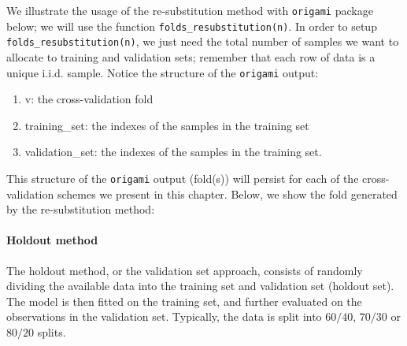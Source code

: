 \documentclass[12pt, krantz2,]{krantz}
\newenvironment{Shaded}{\begin{snugshade}}{\end{snugshade}}
\newcommand{\CommentTok}[1]{\textcolor[rgb]{0.37,0.37,0.37}{\textit{#1}}}
\newcommand{\KeywordTok}[1]{\textcolor[rgb]{0.27,0.27,0.27}{\textbf{#1}}}
\newcommand{\NormalTok}[1]{#1}
\providecommand{\tightlist}{%
  \setlength{\itemsep}{0pt}\setlength{\parskip}{0pt}}
\let\oldparagraph\paragraph
\renewcommand{\paragraph}[1]{\oldparagraph{#1}\mbox{}}
\theoremstyle{definition}
\theoremstyle{definition}
\theoremstyle{definition}
\newcommand{\1}{\mathbbm{1}}
\begin{document}
We illustrate the usage of the re-substitution method with \texttt{origami} package
below; we will use the function \texttt{folds\_resubstitution(n)}. In order to setup
\texttt{folds\_resubstitution(n)}, we just need the total number of samples we want to
allocate to training and validation sets; remember that each row of data is a
unique i.i.d. sample. Notice the structure of the \texttt{origami} output:

\begin{enumerate}
\def\labelenumi{\arabic{enumi}.}
\tightlist
\item
  v: the cross-validation fold
\item
  training\_set: the indexes of the samples in the training set
\item
  validation\_set: the indexes of the samples in the training set.
\end{enumerate}

This structure of the \texttt{origami} output (fold(s)) will persist for each of the
cross-validation schemes we present in this chapter. Below, we show the fold
generated by the re-substitution method:

\begin{Shaded}
\end{Shaded}

\hypertarget{holdout-method}{%
\paragraph{Holdout method}\label{holdout-method}}

The holdout method, or the validation set approach, consists of randomly
dividing the available data into the training set and validation set (holdout
set). The model is then fitted on the training set, and further evaluated on
the observations in the validation set. Typically, the data is split into
\(60/40\), \(70/30\) or \(80/20\) splits.
\end{document}
